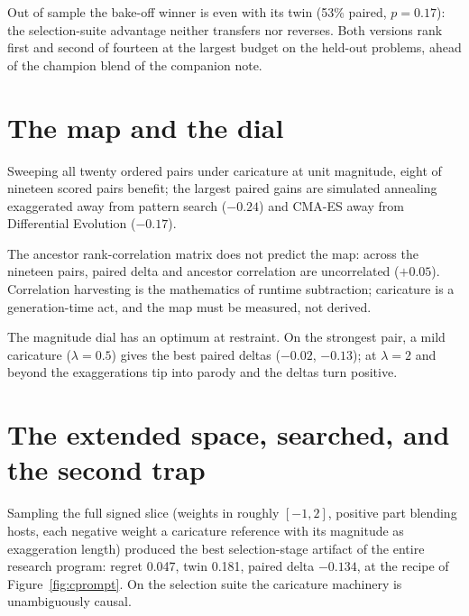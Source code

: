 \documentclass[11pt]{article}
\begin{document}
Out of sample the bake-off winner is even with its twin (53\% paired,
$p = 0.17$): the selection-suite advantage neither transfers nor reverses.
Both versions rank first and second of fourteen at the largest budget on
the held-out problems, ahead of the champion blend of the companion note.

\section{The map and the dial}

Sweeping all twenty ordered pairs under caricature at unit magnitude, eight
of nineteen scored pairs benefit; the largest paired gains are simulated
annealing exaggerated away from pattern search ($-0.24$) and CMA-ES away
from Differential Evolution ($-0.17$).

The ancestor rank-correlation matrix does not predict the map: across the
nineteen pairs, paired delta and ancestor correlation are uncorrelated
($+0.05$). Correlation harvesting is the mathematics of runtime
subtraction; caricature is a generation-time act, and the map must be
measured, not derived.

The magnitude dial has an optimum at restraint. On the strongest pair, a
mild caricature ($\lambda = 0.5$) gives the best paired deltas ($-0.02$,
$-0.13$); at $\lambda = 2$ and beyond the exaggerations tip into parody and
the deltas turn positive.

\section{The extended space, searched, and the second trap}

Sampling the full signed slice (weights in roughly $[-1, 2]$, positive part
blending hosts, each negative weight a caricature reference with its
magnitude as exaggeration length) produced the best selection-stage
artifact of the entire research program: regret 0.047, twin 0.181, paired
delta $-0.134$, at the recipe of Figure~\ref{fig:cprompt}. On the selection
suite the caricature machinery is unambiguously causal.
\end{document}
